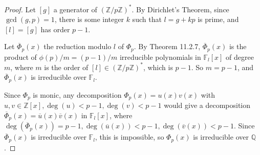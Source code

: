 \documentclass[11pt,a4paper]{article}
\newcommand{\Q}{\mathbb{Q}}
\newcommand{\Z}{\mathbb{Z}}
\newcommand{\F}{\mathbb{F}}
\begin{document}
\begin{proof}
Let $[g]$ a generator of $(\Z/p\Z)^*$. By Dirichlet's Theorem, since $\gcd(g,p)=1$, there is some integer $k$ such that $l = g+kp$ is prime, and  $[l] = [g]$ has order $p-1$.

Let $\overline{\Phi}_p(x)$ the reduction modulo $l$ of $\Phi_p$. By Theorem 11.2.7, $\overline{\Phi}_p(x)$ is the product of $\phi(p)/m = (p-1)/m$  irreducible polynomials in $\F_l[x]$ of degree $m$, where $m$ is the order of $[l] \in (\Z/p\Z)^*$, which is $p-1$. So $m = p-1$, and $\overline{\Phi}_p(x)$ is irreducible over $\F_l$.

 Since $\Phi_p$ is monic, any decomposition $\Phi_p(x) = u(x) v(x)$ with $u,v \in \Z[x], \deg(u)<p-1, \deg(v)<p-1$ would give a decomposition $\overline{\Phi}_p(x)= \overline{u}(x) \overline{v}(x)$ in $\F_l[x]$, where $\deg(\overline{\Phi}_p(x)) = p-1, \deg(\overline{u}(x))<p-1,\deg( \overline{v}(x)) < p-1$. Since $\overline{\Phi}_p(x)$ is irreducible over $\F_l$, this is impossible, so $\Phi_p(x)$ is irreducible over $\Q$.
\end{proof}
\end{document}
